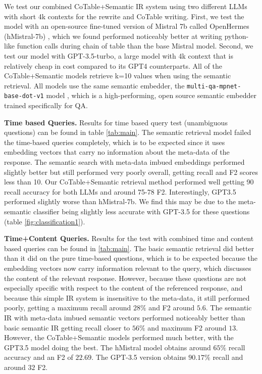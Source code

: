 \documentclass{article}
\begin{document}
We test our combined CoTable+Semantic IR system using two different LLMs with short 4k contexts for the rewrite and CoTable writing. First, we test the model with an open-source fine-tuned version of Mistral 7b \cite{jiang2023mistral} called OpenHermes (hMistral-7b) \cite{openhermes2023}, which we found performed noticeably better at writing python-like function calls during chain of table than the base Mistral model. Second, we test our model with GPT-3.5-turbo, a large model with 4k context that is relatively cheap in cost compared to its GPT4 counterparts. All of the CoTable+Semantic models retrieve k=10 values when using the semantic retrieval. All models use the same semantic embedder, the \texttt{multi-qa-mpnet-base-dot-v1} model \cite{sentencetransformer2022}, which is a high-performing, open source semantic embedder trained specifically for QA.

\textbf{Time based Queries.} Results for time based query test (unambiguous questions) can be found in table \ref{tab:main}. The semantic retrieval model failed the time-based queries completely, which is to be expected since it uses embedding vectors that carry no information about the meta-data of the response. The semantic search with meta-data imbued embeddings performed slightly better but still performed very poorly overall, getting recall and F2 scores less than 10. Our CoTable+Semantic retrieval method performed well getting 90 recall accuracy for both LLMs and around 75-78 F2. Interestingly, GPT3.5 performed slightly worse than hMistral-7b. We find this may be due to the meta-semantic classifier being slightly less accurate with GPT-3.5 for these questions (table \ref{fig:classification1}).

\textbf{Time+Content Queries.} Results for the test with combined time and content based queries can be found in \ref{tab:main}. The basic semantic retrieval did better than it did on the pure time-based questions, which is to be expected because the embedding vectors now carry information relevant to the query, which discusses the content of the relevant response. However, because these questions are not especially specific with respect to the content of the referenced response, and because this simple IR system is insensitive to the meta-data, it still performed poorly, getting a maximum recall around $28\%$ and F2 around $5.6$. The semantic IR with meta-data imbued semantic vectors performed noticeably better than basic semantic IR getting recall closer to $56\%$ and maximum F2 around $13$. However, the CoTable+Semantic models performed much better, with the GPT3.5 model doing the best. The hMistral model obtains around $65\%$ recall accuracy and an F2 of $22.69$. The GPT-3.5 version obtains $90.17\%$ recall and around $32$ F2.
\end{document}
